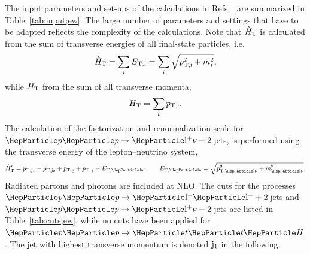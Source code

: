 \documentclass[11pt]{cernrep}
\begin{document}
The input parameters and set-ups of the calculations in
Refs.~\cite{Denner:2014ina,Kallweit:2015dum,Frixione:2015zaa} are
summarized in Table~\ref{tab:input;ew}. The large number of parameters
and settings that have to be adapted reflects the complexity of the
calculations. Note that $\hat{H}_{\rm T}$ is
calculated from the sum of transverse energies of all final-state
particles, i.e.\ 
\begin{equation}
\hat{H}_{\rm T} = \sum_i E_{\rm T,i}= \sum_i \sqrt{p_{\rm T,i}^2+m^2_i},
\end{equation} 
while $H_{\rm T}$ from the sum of all transverse momenta,
\begin{equation}
{H}_{\rm T} =  \sum_i p_{\rm T,i}.
\end{equation} 
The calculation of the factorization and renormalization scale for $\Pp\Pp\to \mathrm{\Pl^+\nu+2}$\,jets,
is performed using the transverse energy of the lepton--neutrino system,
\begin{equation}
\label{eq:hprime;ew}
\hat{H}'_{\rm T} = p_{\rm T,j_1}+p_{\rm T,j_2}+ p_{\rm T,g}+p_{\rm
  T,\gamma}+E_{\rm T,\Pl\nu}, \qquad E_{\rm T,\Pl\nu} = \sqrt{p_{\rm T,\Pl\nu}^2+m^2_{\rm \Pl\nu}}.
\end{equation} 
Radiated partons and photons are included at NLO.
 The cuts for the processes $\Pp\Pp\to
\mathrm{\Pl^+\Pl^-}+2{}$\,jets and  $\Pp\Pp\to
\mathrm{\Pl^+\nu+2}$\,jets are listed in Table~\ref{tab:cuts;ew}, while
no cuts have been applied for $\Pp\Pp\to \PQt\bar\PQt\PH$.
 The jet with highest
transverse momentum is denoted $\rm j_1$ in the following.
\end{document}
